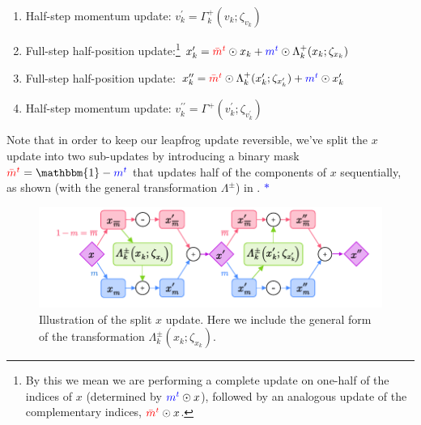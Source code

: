 \documentclass{article} %
\newcommand{\mbart}{\textcolor{red}{\bar{m}^{t}}}
\newcommand{\mt}{\textcolor{blue}{m^{t}}}
\begin{document}
\begin{enumerate}
   \item Half-step momentum update:%
      \hspace{29pt}\(%
         v^{\prime}_{k} = \Gamma^{+}_{k}(v_{k};\zeta_{v_{k}})%
   \)
   \item Full-step half-position update:\footnote{%
         By this we mean we are performing a complete update on one-half of the indices of \(x\) (determined by
         \(\mt\odot x\)), followed by an analogous update of the complementary indices, \(\mbart\odot x\).
   }
      \hspace{14pt} \(%
         x^{\prime}_{k} = \mbart\odot x_{k} + \mt\odot \Lambda^{+}_{k}(x_{k};\zeta_{x_{k}})
   \)
   \item Full-step half-position update:%
      \hspace{21pt} \(%
         x^{\prime\prime}_{k} = \mbart\odot\Lambda^{+}_{k}(x^{\prime}_{k};\zeta_{x^{\prime}_{k}}) + \mt\odot x^{\prime}_{k}
   \)
   \item Half-step momentum update:%
      \hspace{25pt} \(%
         v^{\prime\prime}_{k} = \Gamma^{+}(v^{\prime}_{k}; \zeta_{v^{\prime}_{k}})
   \)
\end{enumerate}
%
Note that in order to keep our leapfrog update reversible, we've split the \(x\) update into two sub-updates by
introducing a binary mask \(\mbart = \mathbbm{1} - \mt\) that updates half of the components of \(x\) sequentially, as
shown (with the general transformation \(\Lambda^{\pm}\)) in . \textcolor{blue}{\(\ast\)}%
\marginpar{\textcolor{blue}{\(\ast\) move splitx fig to appendix?}}
%
\begin{figure}[htpb]
   \centering
   \includegraphics[width=\textwidth]{figures/splitx10.pdf}
   \caption{\label{fig:splitx}Illustration of the split \(x\) update. Here we include the general form of the
   transformation \(\Lambda^{\pm}_{k}(x_{k};\zeta_{x_{k}})\).}
\end{figure}
%
\end{document}

